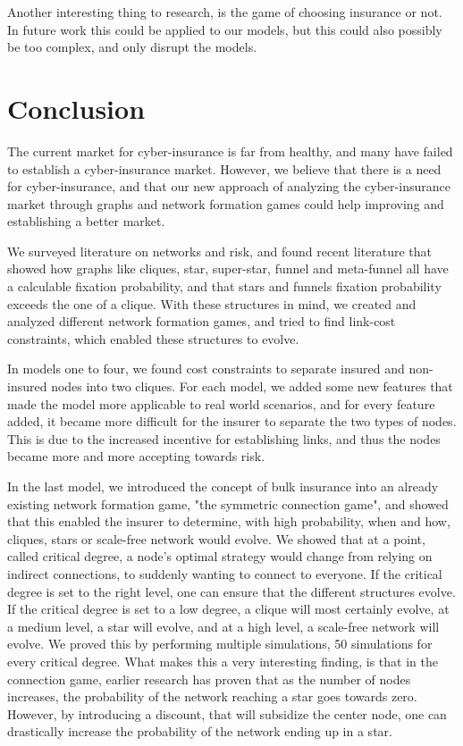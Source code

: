 Another interesting thing to research, is the game of choosing insurance or not. In future work this could be applied to our models, but this could also possibly be too complex, and only disrupt the models.

\section{Conclusion}

The current market for cyber-insurance is far from healthy, and many have failed to establish a cyber-insurance market. However, we believe that there is a need for cyber-insurance, and that our new approach of analyzing the cyber-insurance market through graphs and network formation games could help improving and establishing a better market.  

We surveyed literature on networks and risk, and found recent literature that showed how graphs like cliques, star, super-star, funnel and meta-funnel all have a calculable fixation probability, and that stars and funnels fixation probability exceeds the one of a clique. 
With these structures in mind, we created and analyzed different network formation games, and tried to find link-cost constraints, which enabled these structures to evolve.

In models one to four, we found cost constraints to separate insured and non-insured nodes into two cliques. 
For each model, we added some new features that made the model more applicable to real world scenarios, and for every feature added, it became more difficult for the insurer to separate the two types of nodes. This is due to the increased incentive for establishing links, and thus the nodes became more and more accepting towards risk. 


In the last model, we introduced the concept of bulk insurance into an already existing network formation game, "the symmetric connection game", and showed that this enabled the insurer to determine, with high probability, when and how, cliques, stars or scale-free network would evolve. We showed that at a point, called critical degree, a node's optimal strategy would change from relying on indirect connections, to suddenly wanting to connect to everyone. If the critical degree is set to the right level, one can ensure that the different structures evolve. If the critical degree is set to a low degree, a clique will most certainly evolve, at a medium level, a star will evolve, and at a high level, a scale-free network will evolve. We proved this by performing multiple simulations, 50 simulations for every critical degree.  
What makes this a very interesting finding, is that in the connection game, earlier research has proven that as the number of nodes increases, the probability of the network reaching a star goes towards zero. However, by introducing a discount, that will subsidize the center node, one can drastically increase the probability of the network ending up in a star.

